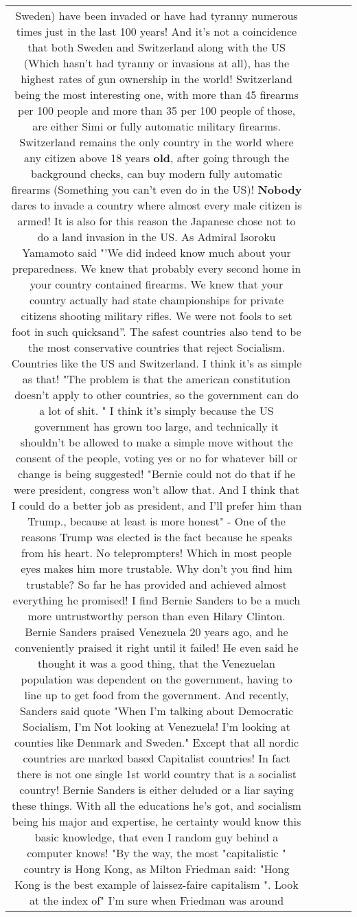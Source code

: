 \documentclass[11pt]{article}
\newlength\mylength
\begin{document}
\begin{center}
\begin{longtable}{|C{.65\mylength}|C{.30\mylength}|C{.12\mylength}|C{.12\mylength}|C{.12\mylength}|}
Sweden) have been invaded or have had tyranny numerous times just in the last 100 years! And it's not a coincidence that both Sweden and Switzerland along with the US (Which hasn't had tyranny or invasions at all), has the highest rates of gun ownership in the world! Switzerland being the most interesting one, with more than 45 firearms per 100 people and more than 35 per 100 people of those, are either Simi or fully automatic military firearms. Switzerland remains the only country in the world where any citizen above 18 years \textbf{old}, after going through the background checks, can buy modern fully automatic firearms (Something you can't even do in the US)! \textbf{Nobody} dares to invade a country where almost every male citizen is armed! It is also for this reason the Japanese chose not to do a land invasion in the US. As Admiral Isoroku Yamamoto said "'We did indeed know much about your preparedness. We knew that probably every second home in your country contained firearms. We knew that your country actually had state championships for private citizens shooting military rifles. We were not fools to set foot in such quicksand''. The safest countries also tend to be the most conservative countries that reject Socialism. Countries like the US and Switzerland. I think it's as simple as that! "The problem is that the american constitution doesn't apply to other countries, so the government can do a lot of shit. " I think it's simply because the US government has grown too large, and technically it shouldn't be allowed to make a simple move without the consent of the people, voting yes or no for whatever bill or change is being suggested! "Bernie could not do that if he were president, congress won't allow that. And I think that I could do a better job as president, and I'll prefer him than Trump., because at least is more honest" - One of the reasons Trump was elected is the fact because he speaks from his heart. No teleprompters! Which in most people eyes makes him more trustable. Why don't you find him trustable? So far he has provided and achieved almost everything he promised! I find Bernie Sanders to be a much more untrustworthy person than even Hilary Clinton. Bernie Sanders praised Venezuela 20 years ago, and he conveniently praised it right until it failed! He even said he thought it was a good thing, that the Venezuelan population was dependent on the government, having to line up to get food from the government. And recently, Sanders said quote "When I'm talking about Democratic Socialism, I'm Not looking at Venezuela! I'm looking at counties like Denmark and Sweden." Except that all nordic countries are marked based Capitalist countries! In fact there is not one single 1st world country that is a socialist country! Bernie Sanders is either deluded or a liar saying these things. With all the educations he's got, and socialism being his major and expertise, he certainty would know this basic knowledge, that even I random guy behind a computer knows! "By the way, the most "capitalistic " country is Hong Kong, as Milton Friedman said: "Hong Kong is the best example of laissez-faire capitalism ". Look at the index of" I'm sure when Friedman was around 
\end{longtable}
\end{center}
\end{document}
